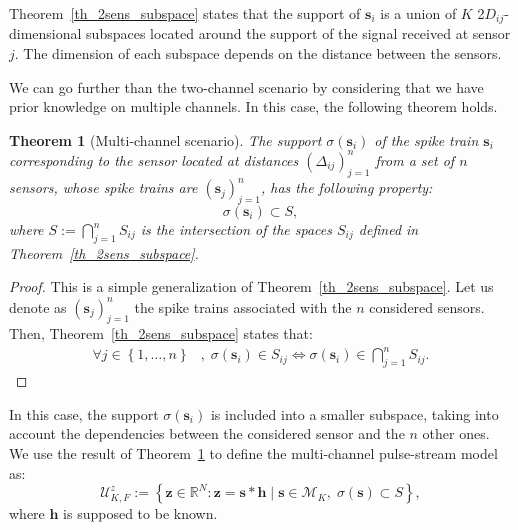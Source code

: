 \documentclass{article}
\newtheorem{theorem}{Theorem}
\newcommand{\vect}[1]{\bm{#1}}
\theoremstyle{definition}
\begin{document}
Theorem~\ref{th_2sens_subspace} states that the support of $\vect{s}_i$ is a union of $K$ \num{2}$D_{ij}$-dimensional subspaces located around the support of the signal received at sensor $j$. The dimension of each subspace depends on the distance between the sensors. 

We can go further than the two-channel scenario by considering that we have prior knowledge on multiple channels. In this case, the following theorem holds.
\begin{theorem}[Multi-channel scenario]
	\label{th_multisens_subspace}
	 The support $\sigma \left(\vect{s}_i\right)$ of the spike train $\vect{s}_i$ corresponding to the sensor located at distances $\left(\Delta_{ij}\right)_{j=1}^n$ from a set of $n$ sensors, whose spike trains are $\left(\vect{s}_j\right)_{j=1}^n$, has the following property:
	\begin{equation*}
	\sigma \left(\vect{s}_i\right) \subset S,
	\end{equation*}
	where $S := \bigcap \limits_{j=1}^{n} S_{ij} $ is the intersection of the spaces $S_{ij}$ defined in Theorem~\ref{th_2sens_subspace}.
\end{theorem}
\begin{proof}
	This is a simple generalization of Theorem~\ref{th_2sens_subspace}. Let us denote as $\left(\vect{s}_j\right)_{j=1}^n$ the spike trains associated with the $n$ considered sensors.
	Then, Theorem~\ref{th_2sens_subspace} states that:
	\begin{align*}
	 \forall j \in \left\lbrace 1,\dots,n \right \rbrace &, \; \sigma \left(\vect{s}_i\right) \in S_{ij}
	 \Leftrightarrow  \sigma \left(\vect{s}_i\right) \in \bigcap \limits_{j=1}^{n} S_{ij}. 
	\end{align*} 
\end{proof}
In this case, the support $\sigma\left(\vect{s}_i\right)$ is included into a smaller subspace, taking into account the dependencies between the considered sensor and the $n$ other ones. 
We use the result of Theorem~\ref{th_multisens_subspace} to define the multi-channel pulse-stream model as:
\begin{equation}
\label{eq_pulse_USstream_model}
\mathcal{U}^z_{K,F}:=\left\lbrace \vect{z} \in \mathbb{R}^N: \vect{z} = \vect{s} \ast \vect{h} \; | \;\vect{s} \in \mathcal{M}_K, \; \sigma\left(\vect{s}\right) \subset S \right\rbrace,
\end{equation} 
where $\vect{h}$ is supposed to be known. 
\end{document}

